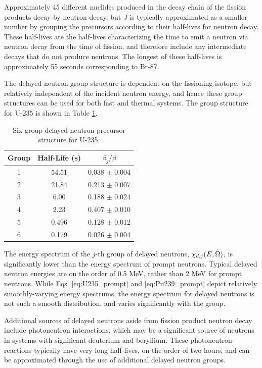 Approximately 45 different nuclides produced in the decay chain of the fission products decay by neutron decay, but \(J\) is typically approximated as a smaller number by grouping the precursors according to their half-lives for neutron decay. These half-lives are the half-lives characterizing the time to emit a neutron via neutron decay from the time of fission, and therefore include any intermediate decays that do not produce neutrons. The longest of these half-lives is approximately 55 seconds corresponding to Br-87.

The delayed neutron group structure is dependent on the fissioning isotope, but relatively independent of the incident neutron energy, and hence these group structures can be used for both fast and thermal systems. The group structure for U-235 is shown in Table \ref{table:U235_delayed}.

\begin{table}[H]
\caption{Six-group delayed neutron precursor structure for U-235.}
\centering
\begin{tabular}{c c c}
\hline\hline
Group & Half-Life (s) & \(\beta_j/\beta\)\\ [0.5ex]
\hline
1 & 54.51 & 0.038 \(\pm\) 0.004\\
2 & 21.84 & 0.213 \(\pm\) 0.007\\
3 & 6.00 & 0.188 \(\pm\) 0.024\\
4 & 2.23 & 0.407 \(\pm\) 0.010\\
5 & 0.496 & 0.128 \(\pm\) 0.012\\
6 & 0.179 & 0.026 \(\pm\) 0.004\\
\hline
\end{tabular}
\label{table:U235_delayed}
\end{table}

The energy spectrum of the \(j\)-th group of delayed neutrons, \(\chi_{d,j}(E,\hat{\Omega})\), is significantly lower than the energy spectrum of prompt neutrons. Typical delayed neutron energies are on the order of 0.5 MeV, rather than 2 MeV for prompt neutrons. While Eqs. \eqref{eq:U235_prompt} and \eqref{eq:Pu239_prompt} depict relatively smoothly-varying energy spectrums, the energy spectrum for delayed neutrons is not such a smooth distribution, and varies significantly with the group.

Additional sources of delayed neutrons aside from fission product neutron decay include photoneutron interactions, which may be a significant source of neutrons in systems with significant deuterium and beryllium. These photoneutron reactions typically have very long half-lives, on the order of two hours, and can be approximated through the use of additional delayed neutron groups.

